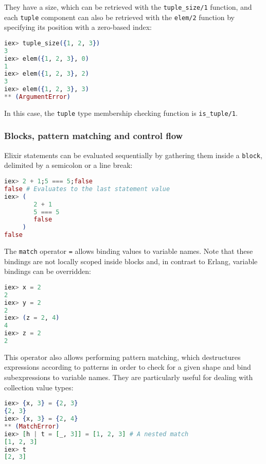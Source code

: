 They have a size, which can be retrieved with the \verb|tuple_size/1| function,
and each \verb|tuple| component can also be retrieved with the \verb|elem/2|
function by specifying its position with a zero-based index:

\begin{lstlisting}[language=elixir,numbers=none,frame=none]
iex> tuple_size({1, 2, 3})
3
iex> elem({1, 2, 3}, 0)
1
iex> elem({1, 2, 3}, 2)
3
iex> elem({1, 2, 3}, 3)
** (ArgumentError)
\end{lstlisting}

In this case, the \verb|tuple| type membership checking function is
\verb|is_tuple/1|.

\subsubsection{Blocks, pattern matching and control flow}

Elixir statements can be evaluated sequentially by gathering them inside a
\verb|block|, delimited by a semicolon or a line break:

\begin{lstlisting}[language=elixir,numbers=none,frame=none]
iex> 2 + 1;5 === 5;false
false # Evaluates to the last statement value
iex> (
        2 + 1
        5 === 5
        false
     )
false
\end{lstlisting}

The \verb|match| operator \verb|=| allows binding values to variable names.
Note that these bindings are not locally scoped inside blocks and, in 
contrast to Erlang, variable bindings can be overridden:

\begin{lstlisting}[language=elixir,numbers=none,frame=none]
iex> x = 2
2
iex> y = 2
2
iex> (z = 2, 4)
4
iex> z = 2
2
\end{lstlisting}

This operator also allows performing pattern matching, which destructures 
expressions according to patterns in order to check for a given shape and 
bind subexpressions to variable names. They are particularly useful for 
dealing with collection value types:

\begin{lstlisting}[language=elixir,numbers=none,frame=none]
iex> {x, 3} = {2, 3}
{2, 3}
iex> {x, 3} = {2, 4}
** (MatchError)
iex> [h | t = [_, 3]] = [1, 2, 3] # A nested match
[1, 2, 3]
iex> t
[2, 3]
\end{lstlisting}

